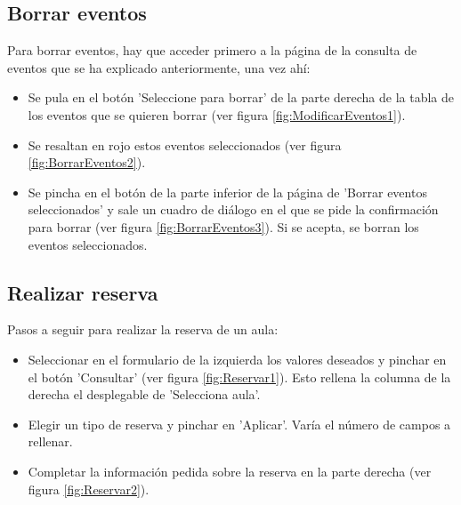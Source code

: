 \subsection{Borrar eventos}
Para borrar eventos, hay que acceder primero a la página de la consulta de eventos que se ha explicado anteriormente, una vez ahí:
\begin{itemize}
    \item Se pula en el botón 'Seleccione para borrar' de la parte derecha de la tabla de los eventos que se quieren borrar (ver figura \ref{fig:ModificarEventos1}).
    \item Se resaltan en rojo estos eventos seleccionados (ver figura \ref{fig:BorrarEventos2}).
    \item Se pincha en el botón de la parte inferior de la página de 'Borrar eventos seleccionados' y sale un cuadro de diálogo en el que se pide la confirmación para borrar (ver figura \ref{fig:BorrarEventos3}). Si se acepta, se borran los eventos seleccionados.
\end{itemize}

\subsection{Realizar reserva}
Pasos a seguir para realizar la reserva de un aula:
\begin{itemize}
    \item Seleccionar en el formulario de la izquierda los valores deseados y pinchar en el botón 'Consultar' (ver figura \ref{fig:Reservar1}). Esto rellena la columna de la derecha el desplegable de 'Selecciona aula'.
    \item Elegir un tipo de reserva y pinchar en 'Aplicar'. Varía el número de campos a rellenar.
    \item Completar la información pedida sobre la reserva en la parte derecha (ver figura \ref{fig:Reservar2}).
\end{itemize}

